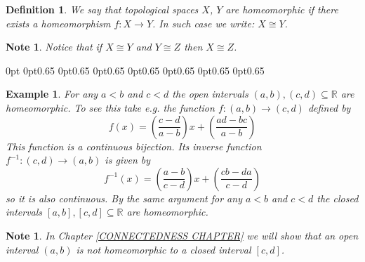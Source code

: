 \documentclass[11pt, letterpaper, oneside]{report}
\theoremstyle{pplain}
\newtheorem{ITERMVALUE THM}[theorem]{Intermediate Value Theorem}
\newtheorem{HEINEBOREL THM}[theorem]{Heine-Borel Theorem}
\newtheorem{UMETR THM}[theorem]{Urysohn Metrization Theorem}
\newtheorem{UMETR2 THM}[theorem]{Urysohn Metrization Theorem (v.2)}
\theoremstyle{ddefinition}
\newtheorem{definition}[theorem]{Definition}
\newtheorem{example}[theorem]{Example}
\newtheorem{note}[theorem]{Note}
\theoremstyle{nnn}
\newtheorem{TDA NN}[theorem]{Topological Data Analysis. }
\theoremstyle{eexercise}
\newcommand{\R}{{\mathbb R}}
\begin{document}
\begin{definition}
\index{$\cong$}
We say that topological spaces $X$, $Y$ are \emph{homeomorphic} if there exists a 
homeomorphism $f\colon X\to Y$. In such case we write: $X\cong Y$. 
\end{definition}

\begin{note}
Notice that if $X\cong Y$ and $Y\cong Z$ then $X\cong Z$. 
\end{note}

0pt\textwidth
0pt\textwidth
0pt\textwidth
0pt0.65\textwidth
0pt0.65\textwidth
0pt0.65\textwidth
0pt0.65\textwidth
0pt0.65\textwidth
0pt0.65\textwidth
0pt0.65\textwidth
0pt\textwidth
\begin{example}
For any $a<b$ and $c< d$ the open intervals $(a, b), (c, d)\subseteq \R$ are homeomorphic. 
To see this take e.g. the function $f\colon (a, b)\to (c, d)$ defined by 
$$f(x) = \left(\frac{c-d}{a-b}\right) x + \left(\frac{ad-bc}{a-b}\right)$$ 
This function is a continuous bijection. Its inverse function  $f^{-1}\colon (c, d) \to (a, b)$ is given by 
$$f^{-1}(x) = \left(\frac{a-b}{c-d}\right) x + \left(\frac{cb-da}{c-d}\right)$$ 
so  it is also continuous. 
By the same argument for any $a< b$ and $c< d$ the closed intervals 
$[a, b], [c, d]\subseteq \R$ are homeomorphic. 
\end{example}

\begin{note}
In Chapter \ref{CONNECTEDNESS CHAPTER} we will show that an open interval $(a, b)$ 
is not homeomorphic to a closed interval $[c, d]$.
\end{note}
\end{document}
